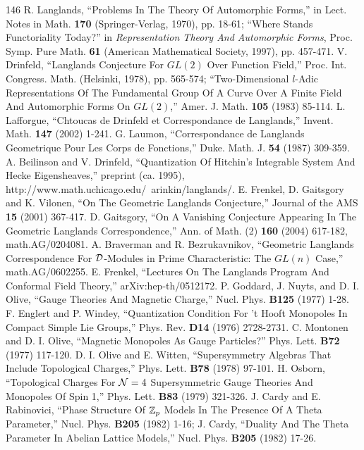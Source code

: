 \begin{thebibliography}{146}
 R. Langlands, ``Problems In The Theory Of Automorphic Forms,'' in Lect. Notes in Math. \textbf{170} (Springer-Verlag, 1970), pp. 18-61; ``Where Stands Functoriality Today?'' in \emph{Representation Theory And Automorphic Forms}, Proc. Symp. Pure Math. \textbf{61} (American Mathematical Society, 1997), pp. 457-471.
 V. Drinfeld, ``Langlands Conjecture For $GL(2)$ Over Function Field,'' Proc. Int. Congress. Math. (Helsinki, 1978), pp. 565-574; ``Two-Dimensional $l$-Adic Representations Of The Fundamental Group Of A Curve Over A Finite Field And Automorphic Forms On $GL(2)$,'' Amer. J. Math. \textbf{105} (1983) 85-114.
 L. Lafforgue, ``Chtoucas de Drinfeld et Correspondance de Langlands,'' Invent. Math. \textbf{147} (2002) 1-241.
 G. Laumon, ``Correspondance de Langlands Geometrique Pour Les Corps de Fonctions,'' Duke. Math. J. \textbf{54} (1987) 309-359.
 A. Beilinson and V. Drinfeld, ``Quantization Of Hitchin's Integrable System And Hecke Eigensheaves,'' preprint (ca. 1995), http://www.math.uchicago.edu/~arinkin/langlands/.
 E. Frenkel, D. Gaitsgory and K. Vilonen, ``On The Geometric Langlands Conjecture,'' Journal of the AMS \textbf{15} (2001) 367-417.
 D. Gaitsgory, ``On A Vanishing Conjecture Appearing In The Geometric Langlands Correspondence,'' Ann. of Math. (2) \textbf{160} (2004) 617-182, math.AG/0204081.
 A. Braverman and R. Bezrukavnikov, ``Geometric Langlands Correspondence For ${\cal D}$-Modules in Prime Characteristic: The $GL(n)$ Case,'' math.AG/0602255.
 E. Frenkel, ``Lectures On The Langlands Program And Conformal Field Theory,'' arXiv:hep-th/0512172.
 P. Goddard, J. Nuyts, and D. I. Olive, ``Gauge Theories And Magnetic Charge,'' Nucl. Phys. \textbf{B125} (1977) 1-28.
 F. Englert and P. Windey, ``Quantization Condition For 't Hooft Monopoles In Compact Simple Lie Groups,'' Phys. Rev. \textbf{D14} (1976) 2728-2731.
 C. Montonen and D. I. Olive, ``Magnetic Monopoles As Gauge Particles?'' Phys. Lett. \textbf{B72} (1977) 117-120.
 D. I. Olive and E. Witten, ``Supersymmetry Algebras That Include Topological Charges,'' Phys. Lett. \textbf{B78} (1978) 97-101.
 H. Osborn, ``Topological Charges For ${\EUN}=4$ Supersymmetric Gauge Theories And Monopoles Of Spin 1,'' Phys. Lett. \textbf{B83} (1979) 321-326.
 J. Cardy and E. Rabinovici, ``Phase Structure Of $\Bbb{Z}_p$ Models In The Presence Of A Theta Parameter,'' Nucl. Phys. \textbf{B205} (1982) 1-16; J. Cardy, ``Duality And The Theta Parameter In Abelian Lattice Models,'' Nucl. Phys. \textbf{B205} (1982) 17-26.

\end{thebibliography}
